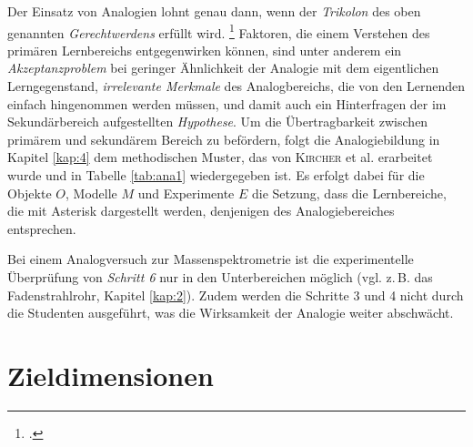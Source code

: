   

\noindent Der Einsatz von Analogien lohnt genau dann, wenn der \textit{Trikolon} des oben genannten \textit{Gerechtwerdens} erfüllt wird. \footcite[vgl.][S.\,125]{Kircher2013} Faktoren, die einem Verstehen des primären Lernbereichs entgegenwirken können, sind unter anderem ein \textit{Akzeptanzproblem} bei geringer Ähnlichkeit der Analogie mit dem eigentlichen Lerngegenstand, \textit{irrelevante Merkmale} des Analogbereichs, die von den Lernenden einfach hingenommen werden müssen, und damit auch ein Hinterfragen der im Sekundärbereich aufgestellten \textit{Hypothese}. Um die Übertragbarkeit zwischen primärem und sekundärem Bereich zu befördern, folgt die Analogiebildung in Kapitel \ref{kap:4} dem methodischen Muster, das von \textsc{Kircher} et al. erarbeitet wurde und in Tabelle \ref{tab:ana1} wiedergegeben ist. Es erfolgt dabei für die Objekte $O$, Modelle $M$ und Experimente $E$ die Setzung, dass die Lernbereiche, die mit Asterisk dargestellt werden, denjenigen des Analogiebereiches entsprechen.

Bei einem Analogversuch zur Massenspektrometrie ist die experimentelle Überprüfung von \textit{Schritt 6} nur in den Unterbereichen möglich (vgl. z.\,B. das Fadenstrahlrohr, Kapitel \ref{kap:2}). Zudem werden die Schritte 3 und 4 nicht durch die Studenten ausgeführt, was die Wirksamkeit der Analogie weiter abschwächt.


\section{Zieldimensionen}

